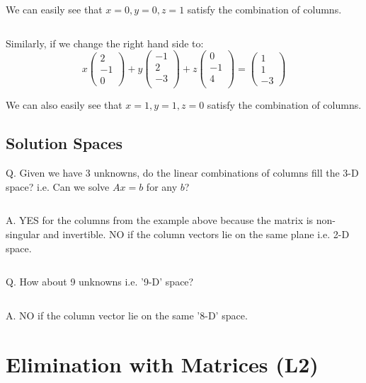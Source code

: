 \documentclass[12pt]{article}
\begin{document}
We can easily see that $x=0, y=0, z=1$ satisfy the combination of columns.

$\>$

Similarly, if we change the right hand side to:
\[
x
\left(
    \begin{matrix}
        2\\ 
        -1\\
        0
    \end{matrix}
\right)
+y
\left(
    \begin{matrix}
        -1\\ 
        2\\
        -3\\
    \end{matrix}
\right)
+z
\left(
    \begin{matrix}
        0\\ 
        -1\\
        4\\
    \end{matrix}
\right)
=
\left(
    \begin{matrix}
        1\\ 
        1\\
        -3
    \end{matrix}
\right)
\]

We can also easily see that $x=1, y=1, z=0$ satisfy the combination of columns.

\subsection{Solution Spaces}

Q. Given we have 3 unknowns, do the linear combinations of columns fill the 3-D space? i.e. Can we solve $Ax=b$ for any $b$?

$\>$

A. YES for the columns from the example above because the matrix is non-singular and invertible. NO if the column vectors lie on the same plane i.e. 2-D space.

$\>$

Q. How about 9 unknowns i.e. '9-D' space?

$\>$

A. NO if the column vector lie on the same '8-D' space.

\newpage

\section{Elimination with Matrices (L2)}
\end{document}
